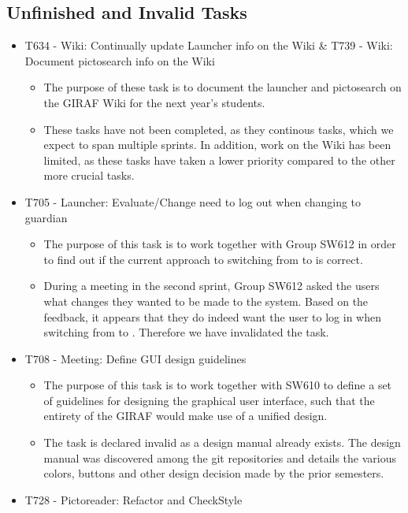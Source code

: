 \subsection{Unfinished and Invalid Tasks}\label{S2Invalid}
\begin{itemize}
  \item T634 - Wiki: Continually update Launcher info on the Wiki \& T739 -
  Wiki: Document pictosearch info on the Wiki
  \begin{itemize}
  	\item The purpose of these task is to document the launcher and pictosearch
  	on the GIRAF Wiki for the next year's students. 
  	\item These tasks have not been completed, as they continous tasks, which we
  	expect to span multiple sprints. In addition, work on the Wiki has been
  	limited, as these tasks have taken a lower priority compared to
  	the other more crucial tasks.
  \end{itemize}
  \item T705 - Launcher: Evaluate/Change need to log out when changing  to
  guardian
  \begin{itemize}
  	\item The purpose of this task is to work together with Group SW612 in order
  	to find out if the current approach to switching from  to
  	 is correct. 
  	\item During a meeting in the second sprint, Group SW612 asked the users
  	what changes they wanted to be made to the system. Based on the feedback, it
  	appears that they do indeed want the user to log in when switching from
  	 to . Therefore we have invalidated the task.
  \end{itemize}
  \item T708 - Meeting: Define GUI design guidelines
  \begin{itemize}
    \item The purpose of this task is to work together with SW610 to define a
    set of guidelines for designing the graphical user interface, such that the
    entirety of the GIRAF would make use of a unified design.
    \item The task is declared invalid as a design manual already exists. The
    design manual was discovered among the git repositories and details the
    various colors, buttons and other design decision made by the prior
    semesters.  
  \end{itemize}
  \item T728 - Pictoreader: Refactor and CheckStyle

\end{itemize}
